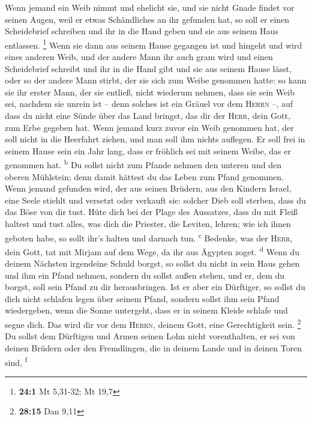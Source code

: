  Wenn jemand ein Weib nimmt und ehelicht sie, und sie
nicht Gnade findet vor seinen Augen, weil er etwas Schändliches an ihr
gefunden hat, so soll er einen Scheidebrief schreiben und ihr in die
Hand geben und sie aus seinem Haus entlassen. \footnote{\textbf{24:1} Mt
  5,31-32; Mt 19,7}  Wenn sie dann aus seinem Hause
gegangen ist und hingeht und wird eines anderen Weib,  und
der andere Mann ihr auch gram wird und einen Scheidebrief schreibt und
ihr in die Hand gibt und sie aus seinem Hause lässt, oder so der andere
Mann stirbt, der sie sich zum Weibe genommen hatte:  so
kann sie ihr erster Mann, der sie entließ, nicht wiederum nehmen, dass
sie sein Weib sei, nachdem sie unrein ist -- denn solches ist ein Gräuel
vor dem \textsc{Herrn} --, auf dass du nicht eine Sünde über das Land
bringst, das dir der \textsc{Herr}, dein Gott, zum Erbe gegeben hat.
 Wenn jemand kurz zuvor ein Weib genommen hat, der soll
nicht in die Heerfahrt ziehen, und man soll ihm nichts auflegen. Er soll
frei in seinem Hause sein ein Jahr lang, dass er fröhlich sei mit seinem
Weibe, das er genommen hat. \textsuperscript{b}  Du sollst
nicht zum Pfande nehmen den unteren und den oberen Mühlstein; denn damit
hättest du das Leben zum Pfand genommen.  Wenn jemand
gefunden wird, der aus seinen Brüdern, aus den Kindern Israel, eine
Seele stiehlt und versetzt oder verkauft sie: solcher Dieb soll sterben,
dass du das Böse von dir tust.  Hüte dich bei der Plage
des Aussatzes, dass du mit Fleiß haltest und tust alles, was dich die
Priester, die Leviten, lehren; wie ich ihnen geboten habe, so sollt
ihr's halten und darnach tun. \textsuperscript{c} 
Bedenke, was der \textsc{Herr}, dein Gott, tat mit Mirjam auf dem Wege,
da ihr aus Ägypten zoget. \textsuperscript{d}  Wenn du
deinem Nächsten irgendeine Schuld borgst, so sollst du nicht in sein
Haus gehen und ihm ein Pfand nehmen,  sondern du sollst
außen stehen, und er, dem du borgst, soll sein Pfand zu dir
herausbringen.  Ist er aber ein Dürftiger, so sollst du
dich nicht schlafen legen über seinem Pfand,  sondern
sollst ihm sein Pfand wiedergeben, wenn die Sonne untergeht, dass er in
seinem Kleide schlafe und segne dich. Das wird dir vor dem
\textsc{Herrn}, deinem Gott, eine Gerechtigkeit sein. \footnote{\textbf{28:15}
  Dan 9,11}  Du sollst dem Dürftigen und Armen seinen
Lohn nicht vorenthalten, er sei von deinen Brüdern oder den Fremdlingen,
die in deinem Lande und in deinen Toren sind, \textsuperscript{f}

